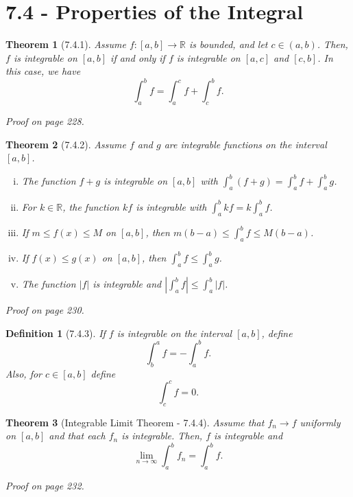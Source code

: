 \documentclass{article}
\newtheorem{definition}{Definition}
\newtheorem{theorem}{Theorem}
\begin{document}
\section*{7.4 - Properties of the Integral}
\begin{theorem}[7.4.1]
    Assume $f:[a,b]\rightarrow \mathbb{R}$ is bounded, and let $c \in (a,b)$. Then, $f$ is integrable on $[a,b]$ if and only if $f$ is integrable on $[a,c]$ and $[c,b]$. In this case, we have \[\int _a^b f = \int _a^c f + \int _c^b f .\]

    Proof on page 228.
\end{theorem}

\begin{theorem}[7.4.2]
    Assume $f$ and $g$ are integrable functions on the interval $[a,b]$.
    \begin{enumerate}[(i)]
        \item The function $f+g$ is integrable on $[a,b]$ with $\int _a^b (f+g) = \int _a^b f + \int _a^b g$.
        \item For $k \in \mathbb{R}$, the function $kf$ is integrable with $\int _a^b kf = k \int _a^b f$.
        \item If $m \leq f(x) \leq M$ on $[a,b]$, then $m(b-a) \leq \int _a^b f \leq M(b-a)$.
        \item If $f(x) \leq g(x)$ on $[a,b]$, then $\int _a^b f \leq \int _a^b g$.
        \item The function $|f|$ is integrable and $|\int _a^b f | \leq \int _a^b |f|$.
    \end{enumerate}

    Proof on page 230.
\end{theorem}

\begin{definition}[7.4.3]
    If $f$ is integrable on the interval $[a,b]$, define \[\int _b^a f = - \int _a^b f.\]
    Also, for $c \in [a,b]$ define \[\int _c^c f = 0.\]
\end{definition}

\begin{theorem}[Integrable Limit Theorem - 7.4.4]
    Assume that $f_n \rightarrow f$ uniformly on $[a,b]$ and that each $f_n$ is integrable. Then, $f$ is integrable and \[\lim _{n \rightarrow \infty} \int _a^b f_n = \int _a^b f.\]

    Proof on page 232.
\end{theorem}
\end{document}
